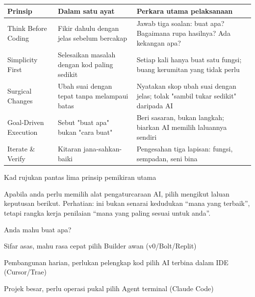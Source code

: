 


\begin{center}
\begin{tabularx}{\linewidth}{|X|X|X|}
\hline
\textbf{Prinsip} & \textbf{Dalam satu ayat} & \textbf{Perkara utama pelaksanaan} \tabularnewline
\hline
Think Before Coding & Fikir dahulu dengan jelas sebelum bercakap & Jawab tiga soalan: buat apa? Bagaimana rupa hasilnya? Ada kekangan apa? \tabularnewline
Simplicity First & Selesaikan masalah dengan kod paling sedikit & Setiap kali hanya buat satu fungsi; buang kerumitan yang tidak perlu \tabularnewline
Surgical Changes & Ubah suai dengan tepat tanpa melampaui batas & Nyatakan skop ubah suai dengan jelas; tolak "sambil tukar sedikit" daripada AI \tabularnewline
Goal-Driven Execution & Sebut "buat apa" bukan "cara buat" & Beri sasaran, bukan langkah; biarkan AI memilih laluannya sendiri \tabularnewline
Iterate \& Verify & Kitaran jana-sahkan-baiki & Pengesahan tiga lapisan: fungsi, sempadan, seni bina \tabularnewline
\hline
\end{tabularx}
\end{center}

\begin{center}\small\color{gray}Kad rujukan pantas lima prinsip pemikiran utama\end{center}


Apabila anda perlu memilih alat pengaturcaraan AI, pilih mengikut laluan keputusan berikut. Perhatian: ini bukan senarai kedudukan “mana yang terbaik”, tetapi rangka kerja penilaian “mana yang paling sesuai untuk anda”.

Anda mahu buat apa?

Sifar asas, mahu rasa cepat pilih Builder awan (v0/Bolt/Replit)

Pembangunan harian, perlukan pelengkap kod pilih AI terbina dalam IDE (Cursor/Trae)

Projek besar, perlu operasi pukal pilih Agent terminal (Claude Code)

